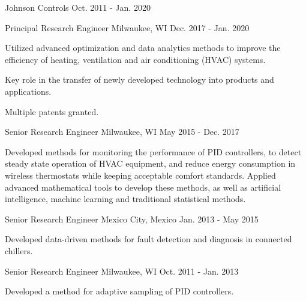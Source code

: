 

\begin{cventries}

\cvmultientry
{Johnson Controls} %
{}
{Oct. 2011 - Jan. 2020} %
{
\cvsubentry
{Principal Research Engineer} %
{Milwaukee, WI} %
{Dec. 2017 - Jan. 2020} %
{
\begin{cvitems} %
\item {Utilized advanced optimization and data analytics methods to improve the efficiency of heating, ventilation and air conditioning (HVAC) systems.}
\item {Key role in the transfer of newly developed technology into products and applications.}
\item {Multiple patents granted.}
\end{cvitems}
}
\cvsubentry
{Senior Research Engineer} %
{Milwaukee, WI} %
{May 2015 - Dec. 2017} %
{
\begin{cvitems} %
\item {Developed methods for monitoring the performance of PID controllers, to detect steady state operation of HVAC equipment, and reduce energy consumption in wireless thermostats while keeping acceptable comfort standards. Applied advanced mathematical tools to develop these methods, as well as artificial intelligence, machine learning and traditional statistical methods.}
\end{cvitems}
}
\cvsubentry
{Senior Research Engineer} %
{Mexico City, Mexico} %
{Jan. 2013 - May 2015} %
{
\begin{cvitems} %
\item {Developed data-driven methods for fault detection and diagnosis in connected chillers.}
\end{cvitems}
}
\cvsubentry
{Senior Research Engineer} %
{Milwaukee, WI} %
{Oct. 2011 - Jan. 2013} %
{
\begin{cvitems} %
\item {Developed a method for adaptive sampling of PID controllers.}
\end{cvitems}
}
}
\end{cventries}
